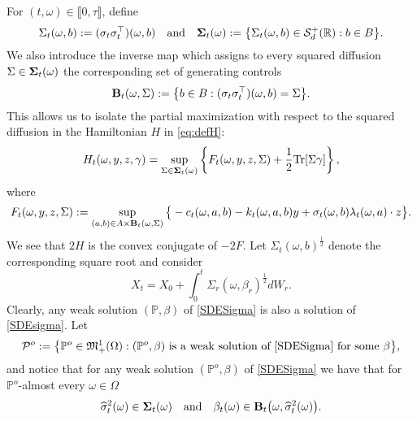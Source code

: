 \documentclass[11pt,a4paper]{article}
\numberwithin{equation}{section}
\def\dbP{\mathbb{P}}
\def\dbR{\mathbb{R}}
\newcommand{\cP}{\mathcal{P}}
\newcommand{\cS}{\mathcal{S}}
\theoremstyle{definition}
\begin{document}
For $(t,\omega)\in\llbracket 0, \tau\rrbracket$, define
  \begin{equation*}  \label{Sigma}
    \Sigma_t(\omega,b):=(\sigma_t\sigma_t^\top)(\omega,b) \quad \mbox{and} \quad {\bf \Sigma}_t(\omega) := \big\{\Sigma_t(\omega,b)\in\cS_d^+(\dbR) : b\in B\big\}.
  \end{equation*}
We also introduce the inverse map which assigns to every squared diffusion $\Sigma\in{\bf \Sigma}_t(\omega)$ the corresponding set of generating controls
  \begin{equation*}
    {\bf B}_t(\omega,\Sigma):=\big\{b\in B: (\sigma_t\sigma_t^\top)(\omega,b)=\Sigma\big\}. 
  \end{equation*}
This allows us to isolate the partial maximization with respect to the squared diffusion in the Hamiltonian $H$ in \eqref{eq:defH}: 
  \begin{align*}
    H_t(\omega,y,z,\gamma) = \sup_{\Sigma\in{\bf\Sigma}_t(\omega)}\left\{F_t(\omega,y,z,\Sigma) + \frac{1}{2}{\rm Tr}[\Sigma\gamma]\right\},
  \end{align*}
  where
  \begin{align*}
    F_t(\omega,y,z,\Sigma):= \sup_{(a,b)\in A\times{\bf B}_t(\omega,\Sigma)}\big\{-c_t(\omega,a,b)-k_t(\omega,a,b)y + \sigma_t(\omega,b)\lambda_t(\omega,a)\cdot z\big\}.
  \end{align*}
We see that $2H$ is the convex conjugate of $-2F$.
Let $\Sigma_t(\omega,b)^{\frac{1}{2}}$ denote the corresponding square root and consider 
  \begin{equation} \label{SDESigma}
   X_t = X_0 + \int_0^t\Sigma_r(\omega,\beta_r)^{\frac{1}{2}}dW_r.
  \end{equation}
Clearly, any weak solution $(\dbP,\beta)$ of \eqref{SDESigma} is also a solution of \eqref{SDEsigma}. 
Let
  \begin{align*}
    \cP^o := \big\{\dbP^o\in\mathfrak{M}_+^1(\Omega): (\dbP^o,\beta) \mbox{ is a weak solution of \eqref{SDESigma} for some }\beta\big\},
  \end{align*}
  and notice that for any weak solution $(\dbP^o,\beta)$ of \eqref{SDESigma} we have that for $\dbP^o$-almost every $\omega\in\Omega$
  \begin{align*}
    \widehat\sigma^2_t(\omega)\in{\bf \Sigma}_t(\omega) \quad \mbox{and} \quad \beta_t(\omega)\in{\bf B}_t\big(\omega,\widehat{\sigma}_t^2(\omega)\big).
  \end{align*}
\end{document}
